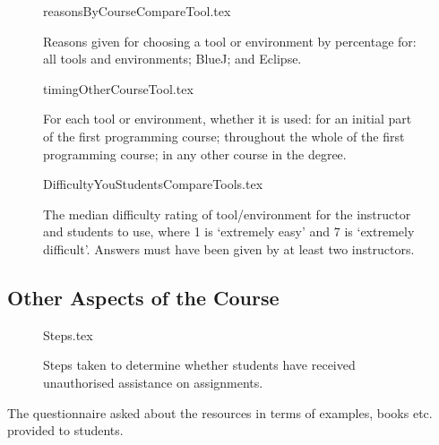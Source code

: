 \documentclass{sig-alternate}
\begin{document}
\begin{figure}
\begin{center}
{reasonsByCourseCompareTool.tex}
\end{center}
\caption{Reasons given for choosing a tool or environment by percentage for: all tools and environments; BlueJ; and Eclipse.}
\end{figure}

\begin{figure}
\begin{center}
{timingOtherCourseTool.tex}
\end{center}\vskip-18pt
\caption{For each tool or environment, whether it is used: for an initial part of the first programming course; throughout the whole of the first programming course; in any other course in the degree.\label{fig:toolreuse}}
\end{figure}


\begin{figure}
\begin{center}
{DifficultyYouStudentsCompareTools.tex}
\end{center}
\caption{The median difficulty rating of tool/environment for the instructor and students to use, where 1 is `extremely easy' and 7 is `extremely difficult'.  Answers must have been given by at least two instructors.\label{fig:toolhard}}
\end{figure}

\subsection{Other Aspects of the Course}

\begin{figure}
\begin{center}
{Steps.tex}
\end{center}\vskip-18pt
\caption{Steps taken to determine whether students have received unauthorised assistance on assignments.}
\end{figure}
\par
The questionnaire asked about the resources in terms of examples, books etc. provided to students. 
\end{document}
